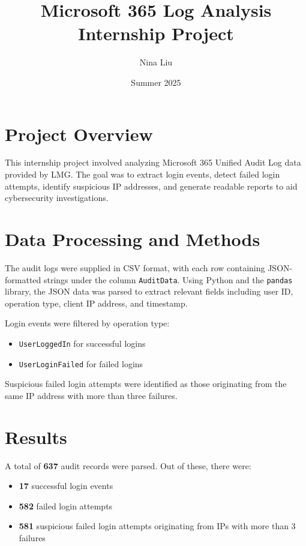 \documentclass{article}
\title{Microsoft 365 Log Analysis Internship Project}
\author{Nina Liu}
\date{Summer 2025}
\begin{document}
\maketitle

\section*{Project Overview}

This internship project involved analyzing Microsoft 365 Unified Audit Log data provided by LMG. The goal was to extract login events, detect failed login attempts, identify suspicious IP addresses, and generate readable reports to aid cybersecurity investigations.

\section*{Data Processing and Methods}

The audit logs were supplied in CSV format, with each row containing JSON-formatted strings under the column \texttt{AuditData}. Using Python and the \texttt{pandas} library, the JSON data was parsed to extract relevant fields including user ID, operation type, client IP address, and timestamp.

Login events were filtered by operation type:
\begin{itemize}
    \item \texttt{UserLoggedIn} for successful logins
    \item \texttt{UserLoginFailed} for failed logins
\end{itemize}

Suspicious failed login attempts were identified as those originating from the same IP address with more than three failures.

\section*{Results}

A total of \textbf{637} audit records were parsed. Out of these, there were:

\begin{itemize}
    \item \textbf{17} successful login events
    \item \textbf{582} failed login attempts
    \item \textbf{581} suspicious failed login attempts originating from IPs with more than 3 failures
\end{itemize}
\end{document}
